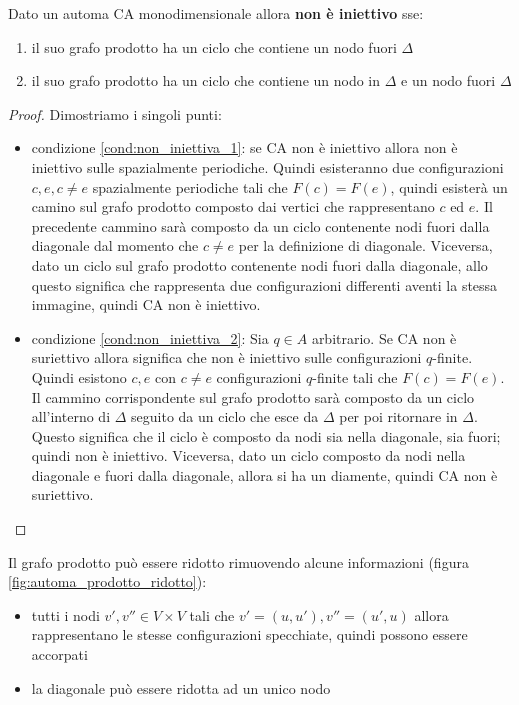\begin{teorema}
    Dato un automa CA monodimensionale allora \textbf{non è iniettivo} sse:
    \begin{enumerate}
        \item \label{cond:non_iniettiva_1} il suo grafo prodotto ha un ciclo che contiene un nodo fuori $\Delta$
        \item \label{cond:non_iniettiva_2}il suo grafo prodotto ha un ciclo che contiene un nodo in $\Delta$ e
              un nodo fuori $\Delta$
    \end{enumerate}
    \begin{proof}
        Dimostriamo i singoli punti:
        \begin{itemize}
            \item condizione \ref{cond:non_iniettiva_1}: se CA non è iniettivo
                  allora non è iniettivo sulle spazialmente periodiche. Quindi esisteranno
                  due configurazioni $c,e, c\ne e$ spazialmente periodiche tali che $F(c) = F(e)$,
                  quindi esisterà un camino sul grafo prodotto composto dai vertici che
                  rappresentano $c$ ed $e$. Il precedente cammino sarà composto da un ciclo
                  contenente nodi fuori dalla diagonale dal momento che $c\ne e$ per la
                  definizione di diagonale. Viceversa, dato un ciclo sul grafo prodotto contenente nodi
                  fuori dalla diagonale, allo questo significa che rappresenta due
                  configurazioni differenti aventi la stessa immagine, quindi CA non è
                  iniettivo.
            \item condizione \ref{cond:non_iniettiva_2}: Sia $q\in A$ arbitrario.
                  Se CA non è suriettivo allora significa che non è iniettivo sulle
                  configurazioni $q$-finite. Quindi esistono $c,e$ con $c\ne e $ configurazioni
                  $q$-finite tali che $F(c) =F(e)$. Il cammino corrispondente sul
                  grafo prodotto sarà composto da un ciclo all'interno di $\Delta$
                  seguito da un ciclo che esce da $\Delta$ per poi ritornare in $\Delta$.
                  Questo significa che il ciclo è composto da nodi sia nella diagonale,
                  sia fuori; quindi non è iniettivo. Viceversa, dato un ciclo composto da nodi nella diagonale
                  e fuori dalla diagonale, allora si ha un diamente, quindi CA non è suriettivo.

        \end{itemize}
    \end{proof}
\end{teorema}
Il grafo prodotto può essere ridotto rimuovendo alcune informazioni (figura \ref{fig:automa_prodotto_ridotto}):
\begin{itemize}
    \item tutti i nodi $v',v'' \in V\times V$ tali che $v'= (u,u'), v''=(u',u)$
          allora rappresentano le stesse configurazioni specchiate, quindi possono essere
          accorpati
    \item la diagonale può essere ridotta ad un unico nodo
\end{itemize}

